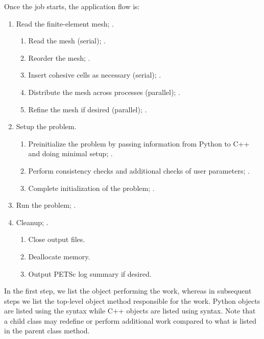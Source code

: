 Once the job starts, the application flow is:
\begin{enumerate}
\item Read the finite-element mesh; .
  \begin{enumerate}
  \item Read the mesh (serial); .
  \item Reorder the mesh; .
  \item Insert cohesive cells as necessary (serial); .
  \item Distribute the mesh across processes (parallel); .
  \item Refine the mesh if desired (parallel); .
  \end{enumerate}
\item Setup the problem.
  \begin{enumerate}
  \item Preinitialize the problem by passing information from Python
    to C++ and doing minimal setup; .
  \item Perform consistency checks and additional checks of user
    parameters; .
  \item Complete initialization of the problem;
    .
  \end{enumerate}
\item Run the problem; .
\item Cleanup; .
  \begin{enumerate}
  \item Close output files.
  \item Deallocate memory.
  \item Output PETSc log summary if desired.
  \end{enumerate}
\end{enumerate}

In the first step, we list the object performing the work, whereas in
subsequent steps we list the top-level object method responsible for
the work. Python objects are listed using the 
syntax while C++ objects are listed using 
syntax. Note that a child class may redefine or perform additional
work compared to what is listed in the parent class method.

